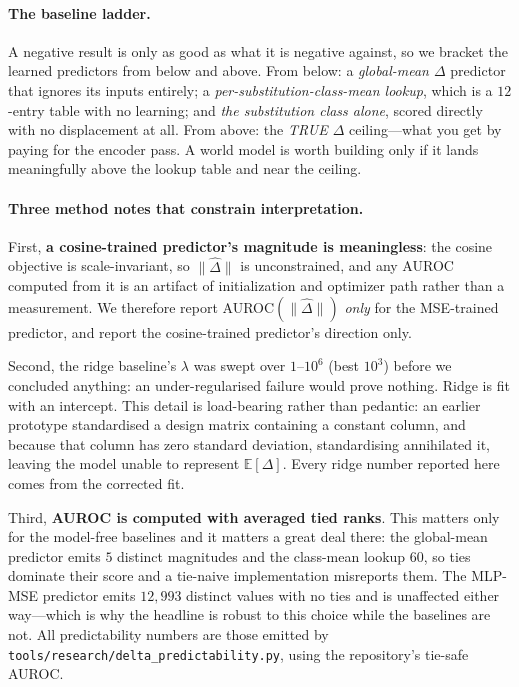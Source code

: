 \documentclass{article}
\newcommand{\D}{\Delta}
\newcommand{\Dhat}{\hat\Delta}
\begin{document}
\paragraph{The baseline ladder.} A negative result is only as good as what it is negative against,
so we bracket the learned predictors from below and above. From below: a \emph{global-mean $\D$}
predictor that ignores its inputs entirely; a \emph{per-substitution-class-mean lookup}, which is a
$12$-entry table with no learning; and \emph{the substitution class alone}, scored directly with no
displacement at all. From above: the \emph{TRUE $\D$} ceiling---what you get by paying for the
encoder pass. A world model is worth building only if it lands meaningfully above the lookup table
and near the ceiling.

\paragraph{Three method notes that constrain interpretation.}
First, \textbf{a cosine-trained predictor's magnitude is meaningless}: the cosine objective is
scale-invariant, so $\lVert\Dhat\rVert$ is unconstrained, and any AUROC computed from it is an
artifact of initialization and optimizer path rather than a measurement. We therefore report
AUROC$(\lVert\Dhat\rVert)$ \emph{only} for the MSE-trained predictor, and report the cosine-trained
predictor's direction only.

Second, the ridge baseline's $\lambda$ was swept over $1$--$10^{6}$ (best $10^{3}$) before we
concluded anything: an under-regularised failure would prove nothing. Ridge is fit with an
intercept. This detail is load-bearing rather than pedantic: an earlier prototype standardised a
design matrix containing a constant column, and because that column has zero standard deviation,
standardising annihilated it, leaving the model unable to represent $\mathbb{E}[\D]$. Every ridge
number reported here comes from the corrected fit.

Third, \textbf{AUROC is computed with averaged tied ranks}. This matters only for the model-free
baselines and it matters a great deal there: the global-mean predictor emits $5$ distinct
magnitudes and the class-mean lookup $60$, so ties dominate their score and a tie-naive
implementation misreports them. The MLP-MSE predictor emits $12{,}993$ distinct values with no
ties and is unaffected either way---which is why the headline is robust to this choice while the
baselines are not. All predictability numbers are those emitted by
\texttt{tools/research/delta\_predictability.py}, using the repository's tie-safe AUROC.
\end{document}
